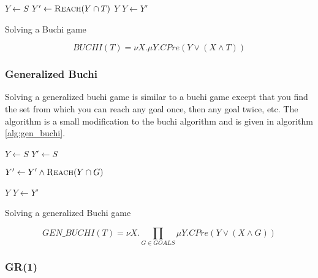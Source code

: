 \documentclass{book}
\newcommand{\buchi}{Buchi }
\theoremstyle{definition}
\begin{document}
\begin{algorithm}[t]
\begin{algorithmic}
\State $Y \gets S$
\Loop
\State $Y' \gets \Call{Reach}{Y \cap T}$
\State\Return $Y$\EndIf
\State $Y \gets Y'$
\EndLoop
\EndFunction
\end{algorithmic}
\caption{Solving a \buchi game}
\label{a:buchi}
\end{algorithm}

\begin{equation}
BUCHI(T) = \nu X. \mu Y. CPre(Y \vee (X \wedge T))
\label{eqn:mu_buchi}
\end{equation}

\subsubsection{Generalized Buchi}

Solving a generalized buchi game is similar to a buchi game except that you find the set from which you can reach any goal once, then any goal twice, etc. The algorithm is a small modification to the buchi algorithm and is given in algorithm \ref{alg:gen_buchi}.

\begin{algorithm}[t]
\begin{algorithmic}
\State $Y \gets S$
\Loop
\State $Y' \gets S$

\State $Y' \gets Y' \wedge \Call{Reach}{Y \cap G}$
\EndFor

\State\Return $Y$\EndIf
\State $Y \gets Y'$

\EndLoop
\EndFunction
\end{algorithmic}
\caption{Solving a generalized \buchi game}
\label{alg:gen_buchi}
\end{algorithm}

\begin{equation}
    GEN\_BUCHI(T) = \nu X. \prod_{G \in GOALS} \mu Y. CPre(Y \vee (X \wedge G))
\label{eqn:mu_buchi}
\end{equation}

\subsubsection{GR(1)}
\end{document}

